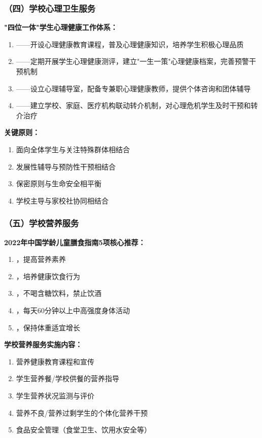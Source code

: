 \subsubsection{（四）学校心理卫生服务}

\begin{keybox}
\textbf{"四位一体"学生心理健康工作体系：}
\begin{enumerate}[leftmargin=*]
    \item {}——开设心理健康教育课程，普及心理健康知识，培养学生积极心理品质
    \item {}——定期开展学生心理健康测评，建立"一生一策"心理健康档案，完善预警干预机制
    \item {}——设立心理辅导室，配备专兼职心理健康教师，提供个体咨询和团体辅导
    \item {}——建立学校、家庭、医疗机构联动转介机制，对心理危机学生及时干预和转介治疗
\end{enumerate}

\textbf{关键原则：}
\begin{enumerate}[leftmargin=*]
    \item 面向全体学生与关注特殊群体相结合
    \item 发展性辅导与预防性干预相结合
    \item 保密原则与生命安全相平衡
    \item 学校主导与家校社协同相结合
\end{enumerate}
\end{keybox}

\subsubsection{（五）学校营养服务}

\begin{keybox}
\textbf{2022年中国学龄儿童膳食指南5项核心推荐：}
\begin{enumerate}[leftmargin=*]
    \item {}，提高营养素养
    \item {}，培养健康饮食行为
    \item {}，不喝含糖饮料，禁止饮酒
    \item {}，每天60分钟以上中高强度身体活动
    \item {}，保持体重适宜增长
\end{enumerate}

\textbf{学校营养服务实施内容：}
\begin{enumerate}[leftmargin=*]
    \item 营养健康教育课程和宣传
    \item 学生营养餐/学校供餐的营养指导
    \item 学生营养状况监测与评价
    \item 营养不良/营养过剩学生的个体化营养干预
    \item 食品安全管理（食堂卫生、饮用水安全等）
\end{enumerate}
\end{keybox}


